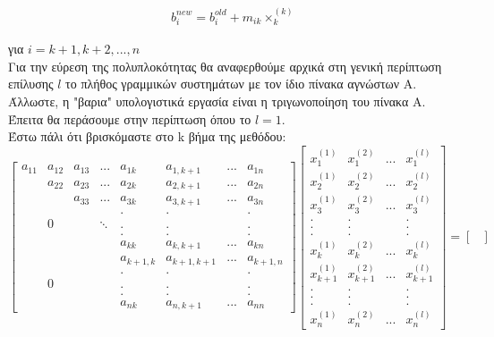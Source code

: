 \documentclass[12pt]{article}
\newcommand{\centered}[1]{\begin{align*}#1\end{align*}}
\begin{document}
\centered{b_{i}^{new} = b_{i}^{old} + m_{ik}\times _{k}^{(k)}}

για $i = k+1, k+2, ...,n$ \\

Για την εύρεση της πολυπλοκότητας θα αναφερθούμε αρχικά στη γενική περίπτωση επίλυσης $l$ το πλήθος γραμμικών συστημάτων με τον ίδιο πίνακα αγνώστων Α. Άλλωστε, η "βαρια" υπολογιστικά εργασία είναι η τριγωνοποίηση του πίνακα Α. Έπειτα θα περάσουμε στην περίπτωση όπου το $l=1$. \\
Έστω πάλι ότι βρισκόμαστε στο k βήμα της μεθόδου:
$$
\begin{bmatrix}
a_{11} & a_{12} & a_{13} & ... & a_{1k} & a_{1,k+1} & ... & a_{1n}\\
& a_{22}  & a_{23}  & ... & a_{2k}  & a_{2,k+1}  & ... & a_{2n} \\
&  & a_{33}  & ... & a_{3k}  & a_{3,k+1}  & ... & a_{3n} \\
&  &  &  & . & . &  & .\\
& 0 &  & \ddots  & . & . &  & .\\
&  &  &  & . & . &  & .\\
&  &  &  & a_{kk}  & a_{k,k+1}  & ... & a_{kn}  \\
&  &  &  & a_{k+1,k}  & a_{k+1,k+1}  & ... & a_{k+1,n} \\
&  &  &  & . & . &  & .\\
& 0 &  &  & . & . &  & .\\
&  &  &  & . & . &  & .\\
&  &  &  & a_{nk}  & a_{n,k+1}  & ... & a_{nn}
\end{bmatrix}
\begin{bmatrix}
x_{1}^{(1)} & x_{1}^{(2)} & ... & x_{1}^{(l)}\\
x_{2}^{(1)} & x_{2}^{(2)} & ... & x_{2}^{(l)}\\
x_{3}^{(1)} & x_{3}^{(2)} & ... & x_{3}^{(l)}\\
. & . &  & .\\
. & . &  & .\\
. & . &  & .\\
x_{k}^{(1)} & x_{k}^{(2)} & ... & x_{k}^{(l)}\\
x_{k+1}^{(1)} & x_{k+1}^{(2)} & ... & x_{k+1}^{(l)}\\
. & . &  & .\\
. & . &  & .\\
. & . &  & .\\
x_{n}^{(1)} & x_{n}^{(2)} & ... & x_{n}^{(l)}
\end{bmatrix}
=
\begin{bmatrix}

\end{bmatrix}$$
\end{document}
